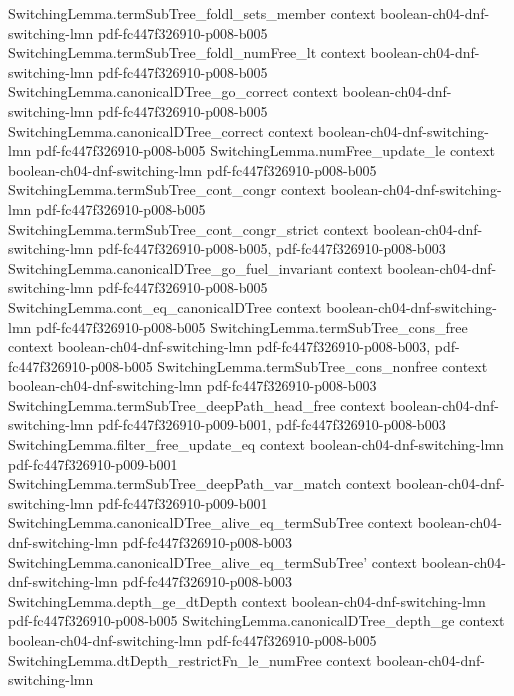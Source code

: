 \begin{theorem}
  {SwitchingLemma.termSubTree_foldl_sets_member}
  {context}
  {boolean-ch04-dnf-switching-lmn}
  {pdf-fc447f326910-p008-b005}
\proofstep
  {SwitchingLemma.termSubTree_foldl_numFree_lt}
  {context}
  {boolean-ch04-dnf-switching-lmn}
  {pdf-fc447f326910-p008-b005}
\proofstep
  {SwitchingLemma.canonicalDTree_go_correct}
  {context}
  {boolean-ch04-dnf-switching-lmn}
  {pdf-fc447f326910-p008-b005}
\proofstep
  {SwitchingLemma.canonicalDTree_correct}
  {context}
  {boolean-ch04-dnf-switching-lmn}
  {pdf-fc447f326910-p008-b005}
\proofstep
  {SwitchingLemma.numFree_update_le}
  {context}
  {boolean-ch04-dnf-switching-lmn}
  {pdf-fc447f326910-p008-b005}
\proofstep
  {SwitchingLemma.termSubTree_cont_congr}
  {context}
  {boolean-ch04-dnf-switching-lmn}
  {pdf-fc447f326910-p008-b005}
\proofstep
  {SwitchingLemma.termSubTree_cont_congr_strict}
  {context}
  {boolean-ch04-dnf-switching-lmn}
  {pdf-fc447f326910-p008-b005,
    pdf-fc447f326910-p008-b003}
\proofstep
  {SwitchingLemma.canonicalDTree_go_fuel_invariant}
  {context}
  {boolean-ch04-dnf-switching-lmn}
  {pdf-fc447f326910-p008-b005}
\proofstep
  {SwitchingLemma.cont_eq_canonicalDTree}
  {context}
  {boolean-ch04-dnf-switching-lmn}
  {pdf-fc447f326910-p008-b005}
\proofstep
  {SwitchingLemma.termSubTree_cons_free}
  {context}
  {boolean-ch04-dnf-switching-lmn}
  {pdf-fc447f326910-p008-b003,
    pdf-fc447f326910-p008-b005}
\proofstep
  {SwitchingLemma.termSubTree_cons_nonfree}
  {context}
  {boolean-ch04-dnf-switching-lmn}
  {pdf-fc447f326910-p008-b003}
\proofstep
  {SwitchingLemma.termSubTree_deepPath_head_free}
  {context}
  {boolean-ch04-dnf-switching-lmn}
  {pdf-fc447f326910-p009-b001,
    pdf-fc447f326910-p008-b003}
\proofstep
  {SwitchingLemma.filter_free_update_eq}
  {context}
  {boolean-ch04-dnf-switching-lmn}
  {pdf-fc447f326910-p009-b001}
\proofstep
  {SwitchingLemma.termSubTree_deepPath_var_match}
  {context}
  {boolean-ch04-dnf-switching-lmn}
  {pdf-fc447f326910-p009-b001}
\proofstep
  {SwitchingLemma.canonicalDTree_alive_eq_termSubTree}
  {context}
  {boolean-ch04-dnf-switching-lmn}
  {pdf-fc447f326910-p008-b003}
\proofstep
  {SwitchingLemma.canonicalDTree_alive_eq_termSubTree'}
  {context}
  {boolean-ch04-dnf-switching-lmn}
  {pdf-fc447f326910-p008-b003}
\proofstep
  {SwitchingLemma.depth_ge_dtDepth}
  {context}
  {boolean-ch04-dnf-switching-lmn}
  {pdf-fc447f326910-p008-b005}
\proofstep
  {SwitchingLemma.canonicalDTree_depth_ge}
  {context}
  {boolean-ch04-dnf-switching-lmn}
  {pdf-fc447f326910-p008-b005}
\proofstep
  {SwitchingLemma.dtDepth_restrictFn_le_numFree}
  {context}
  {boolean-ch04-dnf-switching-lmn}

\end{theorem}
